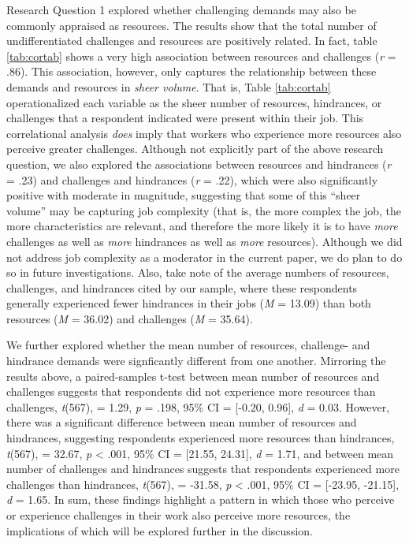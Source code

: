 \documentclass[
  man]{apa6}
\begin{document}
Research Question 1 explored whether challenging demands may also be commonly appraised as resources. The results show that the total number of undifferentiated challenges and resources are positively related. In fact, table \ref{tab:cortab} shows a very high association between resources and challenges (\emph{r} = .86). This association, however, only captures the relationship between these demands and resources in \emph{sheer volume}. That is, Table \ref{tab:cortab} operationalized each variable as the sheer number of resources, hindrances, or challenges that a respondent indicated were present within their job. This correlational analysis \emph{does} imply that workers who experience more resources also perceive greater challenges. Although not explicitly part of the above research question, we also explored the associations between resources and hindrances (\emph{r} = .23) and challenges and hindrances (\emph{r} = .22), which were also significantly positive with moderate in magnitude, suggesting that some of this ``sheer volume'' may be capturing job complexity (that is, the more complex the job, the more characteristics are relevant, and therefore the more likely it is to have \emph{more} challenges as well as \emph{more} hindrances as well as \emph{more} resources). Although we did not address job complexity as a moderator in the current paper, we do plan to do so in future investigations. Also, take note of the average numbers of resources, challenges, and hindrances cited by our sample, where these respondents generally experienced fewer hindrances in their jobs (\emph{M} = 13.09) than both resources (\emph{M} = 36.02) and challenges (\emph{M} = 35.64).

We further explored whether the mean number of resources, challenge- and hindrance demands were signficantly different from one another. Mirroring the results above, a paired-samples t-test between mean number of resources and challenges suggests that respondents did not experience more resources than challenges, \emph{t}(567), = 1.29, \emph{p} = .198, 95\% CI = {[}-0.20, 0.96{]}, \emph{d} = 0.03. However, there was a significant difference between mean number of resources and hindrances, suggesting respondents experienced more resources than hindrances, \emph{t}(567), = 32.67, \emph{p} \textless{} .001, 95\% CI = {[}21.55, 24.31{]}, \emph{d} = 1.71, and between mean number of challenges and hindrances suggests that respondents experienced more challenges than hindrances, \emph{t}(567), = -31.58, \emph{p} \textless{} .001, 95\% CI = {[}-23.95, -21.15{]}, \emph{d} = 1.65. In sum, these findings highlight a pattern in which those who perceive or experience challenges in their work also perceive more resources, the implications of which will be explored further in the discussion.
\end{document}
